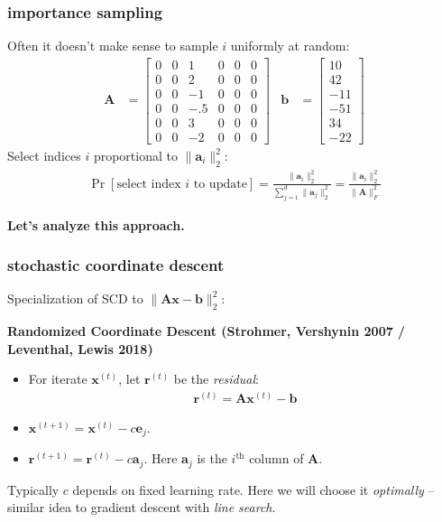 \documentclass[compress]{beamer}
\newcommand{\bv}[1]{\mathbf{#1}}
\begin{document}
\begin{frame}[t]
	\frametitle{importance sampling}
	Often it doesn't make sense to sample $i$ uniformly at random:
	\begin{align*}
	\bv{A} &= \begin{bmatrix} 
	0 & 0 & 1 & 0 & 0 & 0 \\
	0 & 0 & 2 & 0 & 0 & 0 \\
	0 & 0 & -1 & 0 & 0 & 0 \\
	0 & 0 & -.5 & 0 & 0 & 0 \\
	0 & 0 & 3 & 0 & 0 & 0 \\
	0 & 0 & -2 & 0 & 0 & 0 
	\end{bmatrix} & 
	\bv{b} &=\begin{bmatrix} 
	 10  \\
	 42 \\
	-11  \\
	 -51 \\
	34\\
	-22 
	\end{bmatrix} 
	\end{align*}
	Select indices $i$ proportional to $\|\bv{a}_i\|_2^2$:
	\begin{align*}
		\Pr[\text{select index $i$ to update}] = \frac{\|\bv{a}_i\|_2^2}{\sum_{j=1}^d \|\bv{a}_j\|_2^2} = \frac{\|\bv{a}_i\|_2^2}{\|\bv{A}\|_F^2} 
	\end{align*}
	\begin{center}
		\alert{\textbf{Let's analyze this approach.}}
	\end{center}
\end{frame}

\begin{frame}[t]
	\frametitle{stochastic coordinate descent}
	Specialization of SCD to $\|\bv{A}\bv{x} - \bv{b}\|_2^2$:
	\vspace{1em}

	\textbf{Randomized Coordinate Descent (Strohmer, Vershynin 2007 / Leventhal, Lewis 2018)}
\begin{itemize}
\item For iterate $\bv{x}^{(t)}$, let $\bv{r}^{(t)}$ be the \emph{residual}:
\begin{align*}
\bv{r}^{(t)} = \bv{A}\bv{x}^{(t)} - \bv{b}
\end{align*}
\item $\bv{x}^{(t+1)} = \bv{x}^{(t)} - c\bv{e}_j$.
\item $\bv{r}^{(t+1)} = \bv{r}^{(t)} - c\bv{a}_j$. Here $\bv{a}_j$ is the $i^\text{th}$ column of $\bv{A}$. 
\end{itemize}

 Typically $c$ depends on fixed learning rate. Here we will choose it \emph{optimally} -- similar idea to gradient descent with \emph{line search}.
\end{frame}
\end{document}
